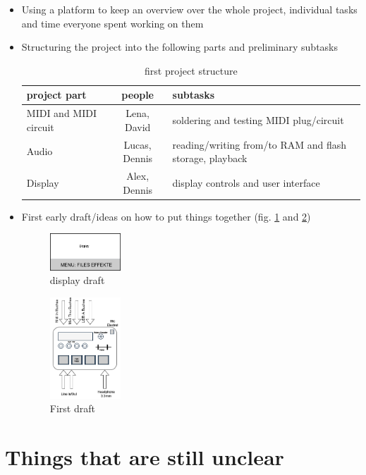 \begin{itemize}
	\item Using a platform to keep an overview over the whole project, individual tasks and time everyone spent working on them
	\item Structuring the project into the following parts and preliminary subtasks
	\begin{table}[!h]
	\centering
	\begin{tabular}{l|c|l}
	\textbf{project part} & \textbf{people} & \textbf{subtasks} \\
	\hline
	MIDI and MIDI circuit  & Lena, David & soldering and testing MIDI plug/circuit \\
	Audio & Lucas, Dennis & reading/writing from/to RAM and flash storage, playback \\
	Display & Alex, Dennis & display controls and user interface \\
	\end{tabular}
	\caption{first project structure}\label{tbl:struct}
	\end{table}

	\item First early draft/ideas on how to put things together (fig. \ref{fig:disp} and \ref{fig:draft})
	\begin{figure}[H]
	\centering
	\includegraphics[width=0.25\textwidth]{draft02.png}
	\caption{display draft}\label{fig:disp}
	\end{figure}
	\begin{figure}[H]
	\centering
	\includegraphics[width=0.25\textwidth]{draft01.png}
	\caption{First draft}\label{fig:draft}
	\end{figure}

\end{itemize}

\section{Things that are still unclear}

